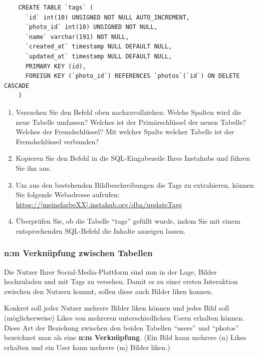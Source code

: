 \begin{myexercise}
  \begin{lstlisting}
    CREATE TABLE `tags` (
      `id` int(10) UNSIGNED NOT NULL AUTO_INCREMENT,
      `photo_id` int(10) UNSIGNED NOT NULL,
      `name` varchar(191) NOT NULL,
      `created_at` timestamp NULL DEFAULT NULL,
      `updated_at` timestamp NULL DEFAULT NULL,
      PRIMARY KEY (id),
      FOREIGN KEY (`photo_id`) REFERENCES `photos`(`id`) ON DELETE CASCADE
    )
  \end{lstlisting}
  \begin{enumerate}
    \item Versuchen Sie den Befehl oben nachzuvollziehen: Welche Spalten wird die neue Tabelle umfassen? Welches ist der Primärschlüssel der neuen Tabelle? Welches der Fremdschlüssel? Mit welcher Spalte welcher Tabelle ist der Fremdschlüssel verbunden?
    \item  Kopieren Sie den Befehl in die SQL-Eingabezeile Ihres Instahubs und führen Sie ihn aus. 
    \item Um aus den bestehenden Bildbeschreibungen die Tags zu extrahieren, können Sie folgende
    Webadresse aufrufen: \url{https://[meinefarbeXX].instahub.org/dba/updateTags}
    \item Überprüfen Sie, ob die Tabelle \enquote{tags} gefüllt wurde, indem Sie mit einem entsprechenden SQL-Befehl die Inhalte anzeigen lassen.
  \end{enumerate}

\end{myexercise}


\subsubsection{n:m Verknüpfung zwischen Tabellen}
Die Nutzer Ihrer Social-Media-Plattform sind nun in der Lage, Bilder hochzuladen und mit Tags zu versehen. Damit es zu einer ersten Interaktion zwischen den Nutzern kommt, sollen diese auch Bilder liken konnen.

Konkret soll jeder Nutzer mehrere Bilder liken können und jedes Bild soll (möglicherweise) Likes von mehreren unterschiedlichen Usern erhalten können. Diese Art der Beziehung zwischen den beiden Tabellen \enquote{users} und \enquote{photos} bezeichnet man als eine \textbf{n:m Verknüpfung}. (Ein Bild kann mehrere (n) Likes erhalten und ein User kann mehrere (m) Bilder liken.)


